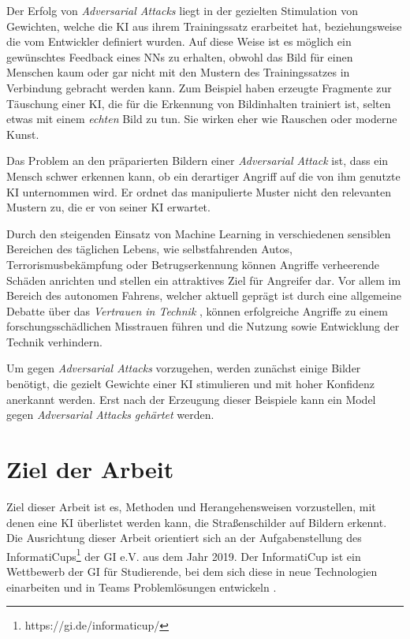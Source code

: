 Der Erfolg von \textit{Adversarial Attacks} liegt in der gezielten Stimulation von Gewichten, welche die \ac{KI} aus ihrem Trainingssatz erarbeitet hat, beziehungsweise die vom Entwickler definiert wurden. 
Auf diese Weise ist es möglich ein gewünschtes Feedback eines \acs{NN}s zu erhalten, obwohl das Bild für einen Menschen kaum oder gar nicht mit den Mustern des Trainingssatzes in Verbindung gebracht werden kann. 
Zum Beispiel haben erzeugte Fragmente zur Täuschung einer \ac{KI}, die für die Erkennung von Bildinhalten trainiert ist, selten etwas mit einem \textit{echten} Bild zu tun. Sie wirken eher wie Rauschen oder moderne Kunst.

Das Problem an den präparierten Bildern einer \textit{Adversarial Attack} ist, dass ein Mensch schwer erkennen kann, ob ein derartiger Angriff auf die von ihm genutzte \ac{KI} unternommen wird. Er ordnet das manipulierte Muster nicht den relevanten Mustern zu, die er von seiner \ac{KI} erwartet.

Durch den steigenden Einsatz von Machine Learning in verschiedenen sensiblen Bereichen des täglichen Lebens, wie selbstfahrenden Autos, Terrorismusbekämpfung oder Betrugserkennung können Angriffe verheerende Schäden anrichten und stellen ein attraktives Ziel für Angreifer dar. 
Vor allem im Bereich des autonomen Fahrens, welcher aktuell geprägt ist durch eine allgemeine Debatte über das \textit{Vertrauen in Technik} \cite{VertrauenTechnik}, können erfolgreiche Angriffe zu einem forschungsschädlichen Misstrauen führen und die Nutzung sowie Entwicklung der Technik verhindern. 

Um gegen \emph{Adversarial Attacks} vorzugehen, werden zunächst einige Bilder benötigt, die gezielt Gewichte einer \ac{KI} stimulieren und mit hoher Konfidenz anerkannt werden. Erst nach der Erzeugung dieser Beispiele kann ein Model gegen \emph{Adversarial Attacks} \textit{gehärtet} werden.

\section{Ziel der Arbeit}
\label{sec:ZielDerArbeit}
Ziel dieser Arbeit ist es, Methoden und Herangehensweisen vorzustellen, mit denen eine \ac{KI} überlistet werden kann, die Straßenschilder auf Bildern erkennt. 
Die Ausrichtung dieser Arbeit orientiert sich an der Aufgabenstellung des InformatiCups\footnote{https://gi.de/informaticup/} der \ac{GI} e.V. aus dem Jahr 2019. Der InformatiCup ist ein Wettbewerb der \ac{GI} für Studierende, bei dem sich diese in neue Technologien einarbeiten und in Teams Problemlösungen entwickeln \cite{gesellschaft_fur_informatik_e.v._informaticup2019-irrbilder.pdf_2018}.

